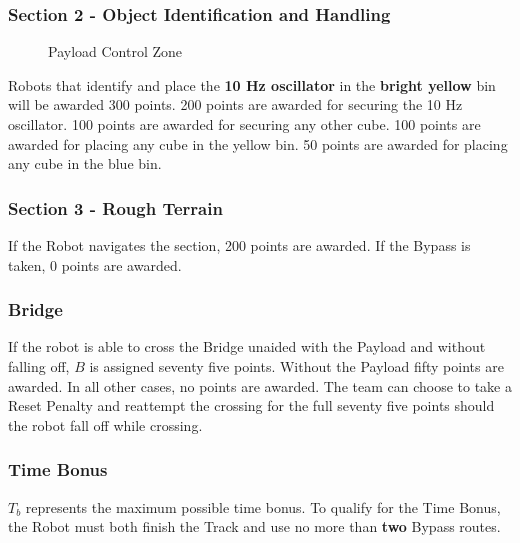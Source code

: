 \subsubsection{Section 2 - Object Identification and Handling}

\begin{figure}[H]
	\centering
	\caption{Payload Control Zone}
	\label{fig:control_zone} 
\end{figure}

Robots that identify and place the \textbf{10 Hz oscillator} in the \textbf{bright yellow} bin will be awarded 300 points. 200 points are awarded for securing the 10 Hz oscillator. 100 points are awarded for securing any other cube. 100 points are awarded for placing any cube in the yellow bin. 50 points are awarded for placing any cube in the blue bin.

\subsubsection{Section 3 - Rough Terrain}
If the Robot navigates the section, 200 points are awarded. If the Bypass is taken, 0 points are awarded.

\subsubsection{Bridge}
If the robot is able to cross the Bridge unaided with the Payload and without falling off, $B$ is assigned seventy five points. Without the Payload fifty points are awarded. In all other cases, no points are awarded. The team can choose to take a Reset Penalty and reattempt the crossing for the full seventy five points should the robot fall off while crossing.

\subsubsection{Time Bonus}
$T_b$ represents the maximum possible time bonus. To qualify for the Time Bonus, the Robot must both finish the Track and use no more than \textbf{two} Bypass routes.


